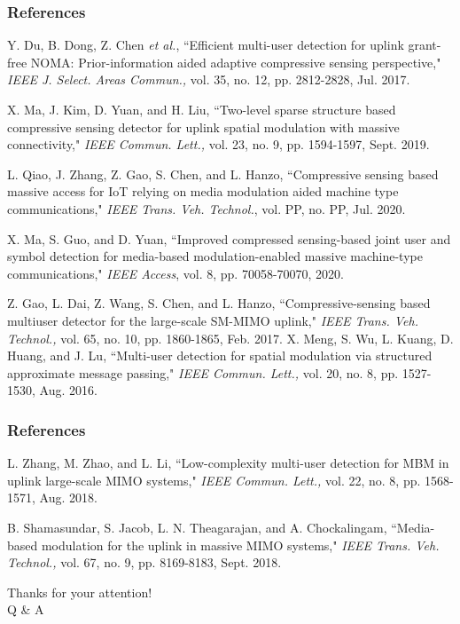 \documentclass[9pt]{beamer}
\begin{document}
\begin{frame}
\frametitle{References}
\begin{thebibliography}{15}
Y. Du, B. Dong, Z. Chen \textit{et al.}, ``Efficient multi-user detection for uplink grant-free NOMA: Prior-information aided adaptive compressive sensing perspective," {\em IEEE J. Select. Areas Commun.,} vol. 35, no. 12, pp. 2812-2828, Jul. 2017.

X. Ma, J. Kim, D. Yuan, and H. Liu, ``Two-level sparse structure based compressive sensing detector for uplink spatial modulation with massive connectivity," {\em IEEE Commun. Lett.,} vol. 23, no. 9, pp. 1594-1597, Sept. 2019.

L. Qiao, J. Zhang, Z. Gao, S. Chen, and L. Hanzo, ``Compressive sensing based massive access for IoT relying on media modulation aided
machine type communications," {\em IEEE Trans. Veh. Technol.}, vol. PP, no. PP, Jul. 2020.

X. Ma, S. Guo, and D. Yuan, ``Improved compressed sensing-based joint user and symbol detection for media-based modulation-enabled massive machine-type communications," {\em IEEE Access}, vol. 8, pp. 70058-70070, 2020.

Z. Gao, L. Dai, Z. Wang, S. Chen, and L. Hanzo, ``Compressive-sensing based multiuser detector for the large-scale SM-MIMO uplink," {\em IEEE Trans. Veh. Technol.,} vol. 65, no. 10, pp. 1860-1865, Feb. 2017.
X. Meng, S. Wu, L. Kuang, D. Huang, and J. Lu, ``Multi-user detection for spatial modulation via structured approximate message passing," {\em IEEE Commun. Lett.,} vol. 20, no. 8, pp. 1527-1530, Aug. 2016.
\end{thebibliography}
\end{frame}

\begin{frame}
\frametitle{References}
\begin{thebibliography}{15}
L. Zhang, M. Zhao, and L. Li, ``Low-complexity multi-user detection for MBM in uplink large-scale MIMO systems," {\em IEEE Commun. Lett.,} vol. 22, no. 8, pp. 1568-1571, Aug. 2018.

B. Shamasundar, S. Jacob, L. N. Theagarajan, and A. Chockalingam, ``Media-based modulation for the uplink in massive MIMO systems," {\em IEEE
Trans. Veh. Technol.,} vol. 67, no. 9, pp. 8169-8183, Sept. 2018.
\end{thebibliography}
\end{frame}

\begin{frame}
 \begin{center}
   \huge Thanks for your attention! \\ Q \& A
 \end{center}
\end{frame}
\end{document}

